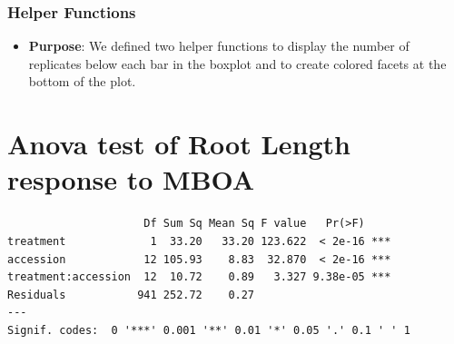 \documentclass[
  11pt,
]{article}
\providecommand{\tightlist}{%
  \setlength{\itemsep}{0pt}\setlength{\parskip}{0pt}}\usepackage{longtable,booktabs,array}
\begin{document}
\subsubsection{Helper Functions}\label{helper-functions}

\begin{itemize}
\tightlist
\item
  \textbf{Purpose}: We defined two helper functions to display the
  number of replicates below each bar in the boxplot and to create
  colored facets at the bottom of the plot.
\end{itemize}

\section{Anova test of Root Length response to
MBOA}\label{anova-test-of-root-length-response-to-mboa}

\begin{verbatim}
                     Df Sum Sq Mean Sq F value   Pr(>F)    
treatment             1  33.20   33.20 123.622  < 2e-16 ***
accession            12 105.93    8.83  32.870  < 2e-16 ***
treatment:accession  12  10.72    0.89   3.327 9.38e-05 ***
Residuals           941 252.72    0.27                     
---
Signif. codes:  0 '***' 0.001 '**' 0.01 '*' 0.05 '.' 0.1 ' ' 1
\end{verbatim}
\end{document}
